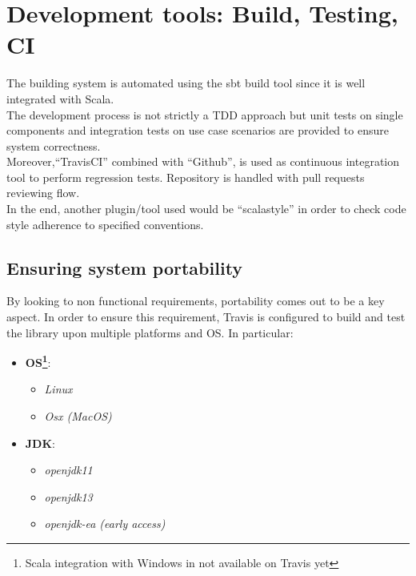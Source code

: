 \section{Development tools: Build, Testing, CI}

The building system is automated using the sbt build tool since it is well integrated with Scala.
\\
The development process is not strictly a TDD approach but unit tests on single components and integration tests on use case scenarios are provided to ensure system correctness.  
\\
Moreover,``TravisCI'' combined with ``Github'', is used as continuous integration tool to perform regression tests. Repository is handled with pull requests reviewing flow.
\\
In the end, another plugin/tool used would be ``scalastyle'' in order to check code style adherence to specified conventions.

\subsection{Ensuring system portability}

By looking to non functional requirements, portability comes out to be a key aspect. In order to ensure this requirement, Travis is configured to build and test the library upon multiple platforms and OS. In particular:
\begin{itemize}
\item \textbf{OS\footnote{Scala integration with Windows in not available on Travis yet}}: 
  \begin{itemize}
  \item \textit{Linux}
  \item \textit{Osx (MacOS)}
  \end{itemize}
\item \textbf{JDK}:
  \begin{itemize}
  \item \textit{openjdk11}
  \item \textit{openjdk13}
  \item \textit{openjdk-ea (early access)}
  \end{itemize} 
\end{itemize}  











 